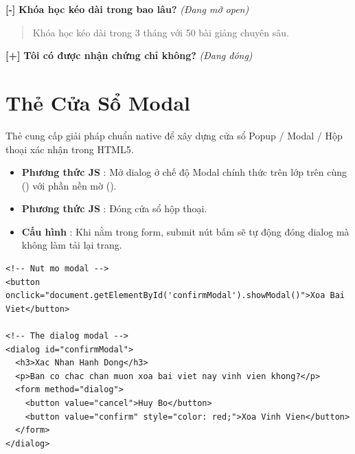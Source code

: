 \begin{browserWindow}
\sffamily\small
\textbf{[-]} \textbf{Khóa học kéo dài trong bao lâu?} \quad \textcolor{codeComment}{\small\textit{(Đang mở open)}} \\
\begin{quote}\small
Khóa học kéo dài trong 3 tháng với 50 bài giảng chuyên sâu.
\end{quote}
\textbf{[+]} \textbf{Tôi có được nhận chứng chỉ không?} \quad \textcolor{codeComment}{\small\textit{(Đang đóng)}}
\end{browserWindow}

\section{Thẻ Cửa Sổ Modal }
\label{sec:dialog_modal}

\begin{conceptBox}
Thẻ  cung cấp giải pháp chuẩn native để xây dựng cửa sổ Popup / Modal / Hộp thoại xác nhận trong HTML5.
\begin{itemize}[leftmargin=1.5em, itemsep=2pt, parsep=0pt]
    \item \textbf{Phương thức JS }: Mở dialog ở chế độ Modal chính thức trên lớp trên cùng () với phần nền mờ ().
    \item \textbf{Phương thức JS }: Đóng cửa sổ hộp thoại.
    \item \textbf{Cấu hình }: Khi nằm trong form, submit nút bấm sẽ tự động đóng dialog mà không làm tải lại trang.
\end{itemize}
\end{conceptBox}

\begin{codeWindow}
\begin{lstlisting}[language=HTML5]
<!-- Nut mo modal -->
<button onclick="document.getElementById('confirmModal').showModal()">Xoa Bai Viet</button>

<!-- The dialog modal -->
<dialog id="confirmModal">
  <h3>Xac Nhan Hanh Dong</h3>
  <p>Ban co chac chan muon xoa bai viet nay vinh vien khong?</p>
  <form method="dialog">
    <button value="cancel">Huy Bo</button>
    <button value="confirm" style="color: red;">Xoa Vinh Vien</button>
  </form>
</dialog>
\end{lstlisting}
\end{codeWindow}

